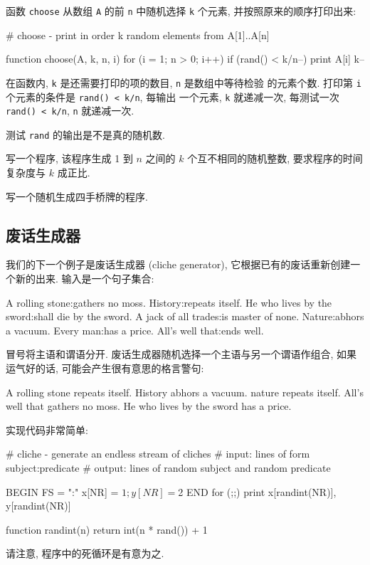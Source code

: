 函数 \texttt{choose} 从数组 \texttt{A} 的前 \texttt{n} 中随机选择
\texttt{k} 个元素, 并按照原来的顺序打印出来:
\begin{awkcode}
    # choose - print in order k random elements from A[1]..A[n]

    function choose(A, k, n,    i) {
        for (i = 1; n > 0; i++)
            if (rand() < k/n--) {
                print A[i]
                k--
            }
    }
\end{awkcode}
在函数内, \texttt{k} 是还需要打印的项的数目, \texttt{n} 是数组中等待检验
的元素个数. 打印第 \texttt{i} 个元素的条件是 \verb'rand() < k/n', 每输出
一个元素, \texttt{k} 就递减一次, 每测试一次 \verb'rand() < k/n',
\texttt{n} 就递减一次.

\begin{exercise}
    \label{exer:rand}
    测试 \texttt{rand} 的输出是不是真的随机数.
\end{exercise}
\begin{exercise}
    \label{exer:rand2}
    写一个程序, 该程序生成 1 到 $n$ 之间的 $k$ 个互不相同的随机整数,
    要求程序的时间复杂度与 $k$ 成正比.
\end{exercise}
\begin{exercise}
    \label{exer:bridge_hands}
    写一个随机生成四手桥牌的程序.
\end{exercise}

\subsection{废话生成器}
\label{subsec:cliche_generation}

我们的下一个例子是废话生成器 (cliche generator),
它根据已有的废话重新创建一个新的出来. 输入是一个句子集合:
\begin{awkcode}
    A rolling stone:gathers no moss.
    History:repeats itself.
    He who lives by the sword:shall die by the sword.
    A jack of all trades:is master of none.
    Nature:abhors a vacuum.
    Every man:has a price.
    All's well that:ends well.
\end{awkcode}
冒号将主语和谓语分开. 废话生成器随机选择一个主语与另一个谓语作组合,
如果运气好的话, 可能会产生很有意思的格言警句:
\begin{awkcode}
    A rolling stone repeats itself.
    History abhors a vacuum.
    nature repeats itself.
    All's well that gathers no moss.
    He who lives by the sword has a price.
\end{awkcode}
实现代码非常简单:
\begin{awkcode}
    # cliche - generate an endless stream of cliches
    #     input:  lines of form subject:predicate
    #     output: lines of random subject and random predicate

    BEGIN { FS = ":" }
          { x[NR] = $1; y[NR] = $2 }
    END   { for (;;) print x[randint(NR)], y[randint(NR)] }

    function randint(n) { return int(n * rand()) + 1 }
\end{awkcode}
请注意, 程序中的死循环是有意为之.

